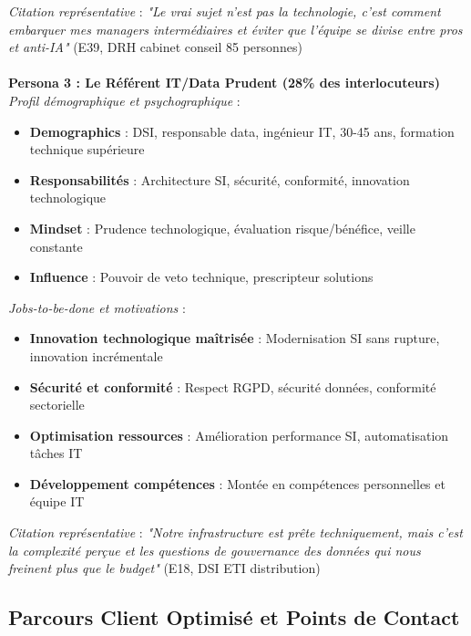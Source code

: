\medskip
\emph{Citation représentative} : \emph{"Le vrai sujet n'est pas la technologie, c'est comment embarquer mes managers intermédiaires et éviter que l'équipe se divise entre pros et anti-IA"} (E39, DRH cabinet conseil 85 personnes)
\\\\
\textbf{Persona 3 : Le Référent IT/Data Prudent (28\% des interlocuteurs)}\\
\emph{Profil démographique et psychographique} :
\begin{itemize}
    \item \textbf{Demographics} : DSI, responsable data, ingénieur IT, 30-45 ans, formation technique supérieure
    \item \textbf{Responsabilités} : Architecture SI, sécurité, conformité, innovation technologique
    \item \textbf{Mindset} : Prudence technologique, évaluation risque/bénéfice, veille constante
    \item \textbf{Influence} : Pouvoir de veto technique, prescripteur solutions
\end{itemize}
\medskip
\emph{Jobs-to-be-done et motivations} :
\begin{itemize}
    \item \textbf{Innovation technologique maîtrisée} : Modernisation SI sans rupture, innovation incrémentale
    \item \textbf{Sécurité et conformité} : Respect RGPD, sécurité données, conformité sectorielle
    \item \textbf{Optimisation ressources} : Amélioration performance SI, automatisation tâches IT
    \item \textbf{Développement compétences} : Montée en compétences personnelles et équipe IT
\end{itemize}
\medskip
\emph{Citation représentative} : \emph{"Notre infrastructure est prête techniquement, mais c'est la complexité perçue et les questions de gouvernance des données qui nous freinent plus que le budget"} (E18, DSI ETI distribution)

\subsection{Parcours Client Optimisé et Points de Contact}


